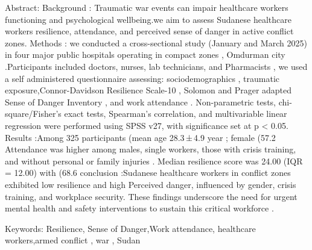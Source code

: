 Abstract:
Background : Traumatic war events can  impair healthcare workers functioning and psychological wellbeing.we aim to assess Sudanese healthcare workers resilience, attendance, and perceived sense of danger in active conflict zones.
Methods : we conducted a cross-sectional study  (January and March 2025) in four major public hospitals  operating in compact zones , Omdurman city .Participants included doctors, nurses,
lab technicians, and Pharmacists , we used a  self administered questionnaire assessing: sociodemographics  , traumatic exposure,Connor-Davidson Resilience Scale-10 , Solomon and Prager adapted Sense of Danger Inventory , and work attendance . Non-parametric tests, chi-square/Fisher’s exact tests, Spearman’s correlation, and multivariable linear regression were performed using SPSS v27, with significance set at p < 0.05.
Results :Among 325 participants (mean age 28.3 ± 4.9 year ;  female (57.2%
 Attendance  was higher among males, single workers, those with crisis training, and  without personal or family injuries . Median resilience score was 24.00 (IQR = 12.00) with (68.6%
conclusion :Sudanese healthcare workers in conflict zones exhibited low resilience and  high Perceived danger,  influenced by  gender, crisis training, and workplace security. These findings underscore the  need for urgent  mental health and safety interventions to sustain this critical workforce .


Keywords: Resilience, Sense of Danger,Work attendance, healthcare workers,armed conflict , war , Sudan 

